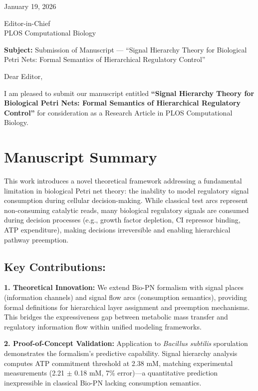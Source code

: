\documentclass[11pt,letterpaper]{article}
\begin{document}
\pagestyle{empty}

\noindent
January 19, 2026

\vspace{12pt}

\noindent
Editor-in-Chief\\
PLOS Computational Biology

\vspace{12pt}

\noindent
\textbf{Subject:} Submission of Manuscript --- ``Signal Hierarchy Theory for Biological Petri Nets: Formal Semantics of Hierarchical Regulatory Control''

\vspace{12pt}

Dear Editor,

I am pleased to submit our manuscript entitled \textbf{``Signal Hierarchy Theory for Biological Petri Nets: Formal Semantics of Hierarchical Regulatory Control''} for consideration as a Research Article in PLOS Computational Biology.

\section*{Manuscript Summary}

This work introduces a novel theoretical framework addressing a fundamental limitation in biological Petri net theory: the inability to model regulatory signal consumption during cellular decision-making. While classical test arcs represent non-consuming catalytic reads, many biological regulatory signals are consumed during decision processes (e.g., growth factor depletion, CI repressor binding, ATP expenditure), making decisions irreversible and enabling hierarchical pathway preemption.

\subsection*{Key Contributions:}

\textbf{1. Theoretical Innovation:} We extend Bio-PN formalism with signal places (information channels) and signal flow arcs (consumption semantics), providing formal definitions for hierarchical layer assignment and preemption mechanisms. This bridges the expressiveness gap between metabolic mass transfer and regulatory information flow within unified modeling frameworks.

\textbf{2. Proof-of-Concept Validation:} Application to \textit{Bacillus subtilis} sporulation demonstrates the formalism's predictive capability. Signal hierarchy analysis computes ATP commitment threshold at 2.38 mM, matching experimental measurements (2.21 $\pm$ 0.18 mM, 7\% error)---a quantitative prediction inexpressible in classical Bio-PN lacking consumption semantics.
\end{document}
